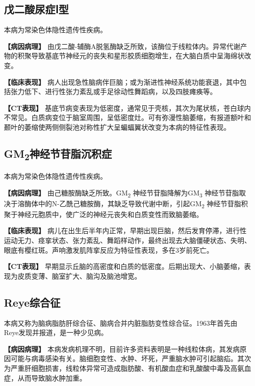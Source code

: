 \subsection{戊二酸尿症Ⅰ型}

本病为常染色体隐性遗传性疾病。

\textbf{【病因病理】}
由戊二酸-辅酶A脱氢酶缺乏所致，该酶位于线粒体内。异常代谢产物的积聚导致基底节神经元的丧失和星形胶质细胞增生，在大脑白质中呈海绵状改变。

\textbf{【临床表现】}
病人出现急性脑病伴巨脑；或为渐进性神经系统功能衰退，其中包括张力低下、进行性张力紊乱或手足徐动性舞蹈病，以及四肢瘫痪等。

\textbf{【CT表现】}
基底节病变表现为低密度，通常见于壳核，其次为尾状核，苍白球内不常见。白质病变位于脑室周围，呈低密度灶。可有弥漫性脑萎缩，有报道额叶和颞叶的萎缩使两侧侧裂池对称性扩大呈蝙蝠翼状改变为本病的特征性表现。

\subsection{GM\textsubscript{2}神经节苷脂沉积症}

本病为常染色体隐性遗传性疾病。

\textbf{【病因病理】} 由己糖胺酶缺乏所致。GM\textsubscript{2}
神经节苷脂降解为GM\textsubscript{3}
神经节苷脂取决于溶酶体中的N-乙酰己糖胺酶，其缺乏导致代谢中断，引起GM\textsubscript{2}
神经节苷脂积聚于神经元胞质中，使广泛的神经元丧失和白质变性而致脑萎缩。

\textbf{【临床表现】}
病儿在出生后半年内正常，早期出现巨脑，然后发育停滞，进行性运动无力、痉挛状态、张力紊乱、舞蹈样动作，最终出现去大脑僵硬状态、失明、眼底有樱红斑。声响激发肌阵挛反应为特征性表现，多在3岁前死亡。

\textbf{【CT表现】}
早期显示丘脑的高密度和白质的低密度。后期出现大、小脑萎缩，表现为皮质变薄、脑室扩大、脑沟及脑池增宽。

\subsection{Reye综合征}

本病又称为脑病脂肪肝综合征、脑病合并内脏脂肪变性综合征。1963年首先由Reye发现并报道，是一种少见病。

\textbf{【病因病理】}
本病发病机理不明，目前许多资料表明是一种线粒体病，其发病原因可能与病毒感染有关。脑细胞变性、水肿、坏死，严重脑水肿可引起脑疝。其次为严重肝细胞损害，线粒体异常可造成脂肪酸、有机酸血症和乳酸酸中毒及高氨血症，从而导致脑水肿加重。

